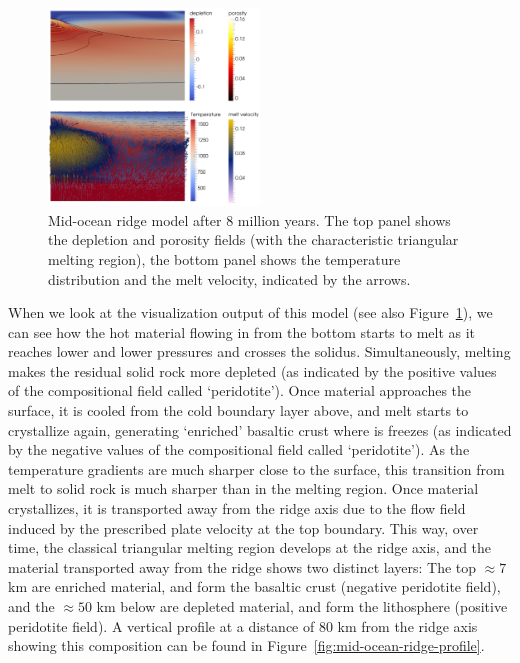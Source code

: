 \documentclass{article}
\begin{document}
\begin{figure}
    \centering
    \includegraphics[width=0.5\textwidth]{cookbooks/mid_ocean_ridge/mid_ocean_ridge.pdf}
    \caption{Mid-ocean ridge model after 8 million years. The top panel shows the depletion 
             and porosity fields (with the characteristic triangular melting region), 
             the bottom panel shows the temperature distribution and the melt velocity, indicated 
             by the arrows.}
    \label{fig:mid-ocean-ridge}
\end{figure}

When we look at the visualization output of this model (see also Figure~\ref{fig:mid-ocean-ridge}), 
we can see how the hot material flowing in 
from the bottom starts to melt as it reaches lower and lower pressures and crosses the solidus.  Simultaneously, melting makes the residual solid rock more depleted (as indicated by the positive 
values of the compositional field called `peridotite'). Once material approaches the surface, 
it is cooled from the cold boundary layer above, and melt starts to crystallize again, generating 
`enriched' basaltic crust where is freezes (as indicated by the negative values of the compositional 
field called `peridotite'). As the temperature gradients are much sharper close to the surface, this 
transition from melt to solid rock is much sharper than in the melting region. Once material 
crystallizes, it is transported away from the ridge axis due to the flow field induced by the prescribed 
plate velocity at the top boundary. This way, over time, the classical triangular melting region develops 
at the ridge axis, and the material transported away from the ridge shows two distinct layers:
The top $\approx 7$ km are enriched material, and form the basaltic crust (negative peridotite field), 
and the $\approx 50$ km below are depleted material, and form the lithosphere (positive peridotite field). 
A vertical profile at a distance of 80 km from the ridge axis showing this composition can be found in Figure~\ref{fig:mid-ocean-ridge-profile}.
\end{document}
